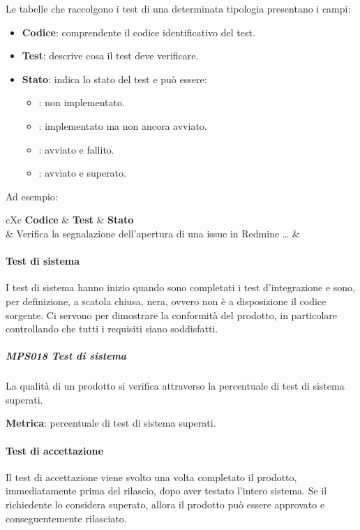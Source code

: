 	    
	    Le tabelle che raccolgono i test di una determinata tipologia presentano i campi:
	    \begin{itemize}
	    	\item \textbf{Codice}: comprendente il codice identificativo del test.
	    	\item \textbf{Test}: descrive cosa il test deve verificare.
	    	\item \textbf{Stato}: indica lo stato del test e può essere:
	    	\begin{itemize}
	    		\item \TNI: non implementato.
	    		\item \TI: implementato ma non ancora avviato.
	    		\item \TNS: avviato e fallito.
	    		\item \TS: avviato e superato.
	    	\end{itemize}
	    \end{itemize}
	    
	    Ad esempio:
	    
	    \begin{table}[H]
	    	\begin{VTtable}[1.7]{\textwidth}{cXc}
	    		\rowcolor{\tablegray}
	    		\textbf{Codice} & \centering\textbf{Test} & \textbf{Stato} \\\toprule
	    		\addtotv & Verifica la segnalazione dell'apertura di una issue in Redmine \dots
	    		& \TNI \\
	    		\bottomrule
	    	\end{VTtable}
	    \end{table}
	    
    
    \paragraph{Test di sistema} \label{testsistema}
    I test di sistema hanno inizio quando sono completati i test d'integrazione e sono, per definizione, a scatola chiusa, nera, ovvero non è a disposizione il codice sorgente.
    Ci servono per dimostrare la conformità del prodotto, in particolare controllando che tutti i requisiti siano soddisfatti.
    
    \subparagraph{MPS018 Test di sistema}\label{testsistema:met}
    La qualità di un prodotto si verifica attraverso la percentuale di test di sistema superati.
    
    \textbf{Metrica}: percentuale di test di sistema superati.
    
    
    \paragraph{Test di accettazione} \label{testaccettazione}
    Il test di accettazione viene svolto una volta completato il prodotto, immediatamente prima del rilascio, dopo aver testato l'intero sistema.
    Se il richiedente lo considera superato, allora il prodotto può essere approvato e conseguentemente rilasciato.